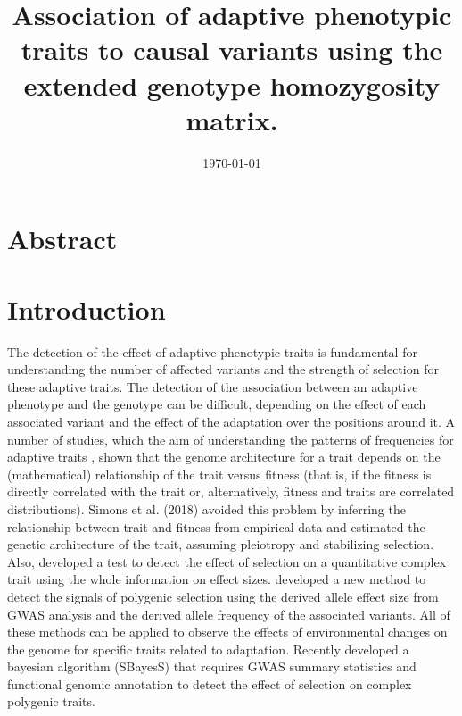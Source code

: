 \documentclass[a4paper,11pt]{article}
\begin{document}
\title{Association of adaptive phenotypic traits to causal variants using the extended genotype homozygosity matrix.}
\date{\today}
\maketitle

\section{Abstract}



\section{Introduction}

The detection of the effect of adaptive phenotypic traits is fundamental for understanding the number of affected variants and the strength of selection for these adaptive traits. The detection of the association between an adaptive phenotype and the genotype can be difficult, depending on the effect of each associated variant and the effect of the adaptation over the positions around it. A number of studies, which the aim of understanding the patterns of frequencies for adaptive traits  \citep[\textit{e.g.},][]{Eyre-Walker:2010aa,Caballero:2015aa,Lourenco:2011aa,Connallon:2015aa}, shown that the genome architecture for a trait depends on the (mathematical) relationship of the trait versus fitness (that is, if the fitness is directly correlated with the trait or, alternatively, fitness and traits are correlated distributions). Simons et al. (2018) avoided this problem by inferring the relationship between trait and fitness from empirical data and estimated the genetic architecture of the trait, assuming pleiotropy and stabilizing selection. Also, \citet{Beissinger:2018aa} developed a test to detect the effect of selection on a quantitative complex trait using the whole information on effect sizes.\citet{Uricchio:2019aa}  developed a new method to detect the signals of polygenic selection using the derived allele effect size from GWAS analysis and the derived allele frequency of the associated variants. All of these methods can be applied to observe the effects of environmental changes on the genome for specific traits related to adaptation. Recently \citet{Zeng752527} developed a bayesian algorithm (SBayesS) that requires GWAS summary statistics and functional genomic annotation to detect the effect of selection on complex polygenic traits. 
\end{document}
